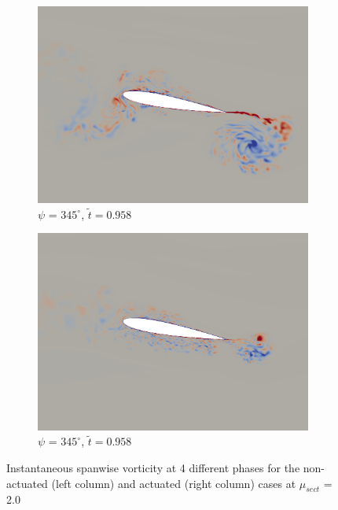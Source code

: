 \begin{figure}[H]
\begin{subfigure}[b]{0.4\textwidth}
	\centering
	\includegraphics[width=1\textwidth]{figures/mu_2pt0/vorticity/baseline/phase_345.png}
	\caption{ $\psi$ = $345^\circ$, $\tilde{t}=0.958$}
	\label{fig:mu_2pt0_non-actuated_psi345}
\end{subfigure}
\begin{subfigure}[b]{0.4\textwidth}
	\centering
	\includegraphics[width=1\textwidth]{figures/mu_2pt0/vorticity/AC/phase_345.png}
	\caption{ $\psi$ = $345^\circ$, $\tilde{t}=0.958$}
	\label{fig:mu_2pt0_AC_psi345}
\end{subfigure}



	\caption{Instantaneous spanwise vorticity at 4 different phases for the non-actuated (left column) and actuated (right column) cases at $\mu_{sect}$ = 2.0}
\label{fig:vortScreen_mu2pt0}
\end{figure}

